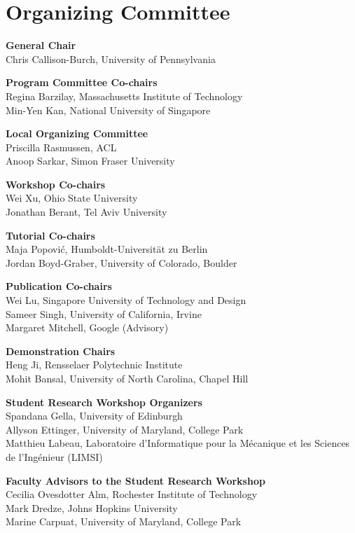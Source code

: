 \markboth{}{} %
\markright{}{} %

\section{Organizing Committee}{}\vspace{2em}

\setlength{\parindent}{0pt}

{\bf General Chair} \\
Chris Callison-Burch, University of Pennsylvania

{\bf Program Committee Co-chairs} \\
Regina Barzilay, Massachusetts Institute of Technology\\
Min-Yen Kan, National University of Singapore

{\bf Local Organizing Committee} \\
Priscilla Rasmussen, ACL\\
Anoop Sarkar, Simon Fraser University

{\bf Workshop Co-chairs} \\
Wei Xu, Ohio State University \\
Jonathan Berant, Tel Aviv University

{\bf Tutorial Co-chairs} \\
Maja Popovi\'{c}, Humboldt-Universität zu Berlin \\
Jordan Boyd-Graber, University of Colorado, Boulder

{\bf Publication Co-chairs} \\
Wei Lu, Singapore University of Technology and Design \\
Sameer Singh, University of California, Irvine \\
Margaret Mitchell, Google (Advisory)

{\bf Demonstration Chairs} \\
Heng Ji, Rensselaer Polytechnic Institute \\
Mohit Bansal, University of North Carolina, Chapel Hill

{\bf Student Research Workshop Organizers} \\
Spandana Gella, University of Edinburgh \\
Allyson Ettinger, University of Maryland, College Park \\
Matthieu Labeau, Laboratoire d’Informatique pour la Mécanique et les Sciences de l’Ingénieur (LIMSI)

{\bf Faculty Advisors to the Student Research Workshop} \\
Cecilia Ovesdotter Alm, Rochester Institute of Technology \\
Mark Dredze, Johns Hopkins University \\
Marine Carpuat, University of Maryland, College Park

